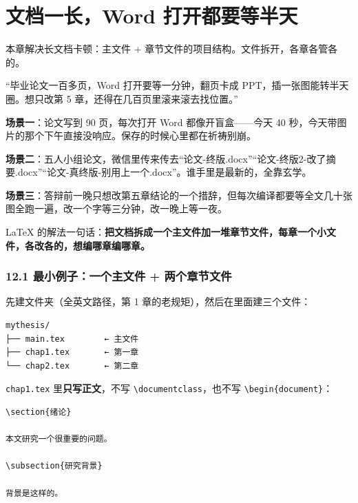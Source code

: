 \chapter{文档一长，Word 打开都要等半天}

\begin{notebox}
本章解决长文档卡顿：主文件 + 章节文件的项目结构。文件拆开，各章各管各的。
\end{notebox}


“毕业论文一百多页，Word 打开要等一分钟，翻页卡成 PPT，插一张图能转半天圈。想只改第 5 章，还得在几百页里滚来滚去找位置。”


\textbf{场景一}：论文写到 90 页，每次打开 Word 都像开盲盒——今天 40 秒，今天带图片的那个下午直接没响应。保存的时候心里都在祈祷别崩。

\textbf{场景二}：五人小组论文，微信里传来传去“论文-终版.docx”“论文-终版2-改了摘要.docx”“论文-真终版-别用上一个.docx”。谁手里是最新的，全靠玄学。

\textbf{场景三}：答辩前一晚只想改第五章结论的一个措辞，但每次编译都要等全文几十张图全跑一遍，改一个字等三分钟，改一晚上等一夜。

LaTeX 的解法一句话：\textbf{把文档拆成一个主文件加一堆章节文件，每章一个小文件，各改各的，想编哪章编哪章。}


\subsection*{12.1 最小例子：一个主文件 + 两个章节文件}

先建文件夹（全英文路径，第 1 章的老规矩），然后在里面建三个文件：

\begin{lstlisting}
mythesis/
├── main.tex        ← 主文件
├── chap1.tex       ← 第一章
└── chap2.tex       ← 第二章
\end{lstlisting}

\texttt{chap1.tex} 里\textbf{只写正文}，不写 \texttt{\textbackslash{}documentclass}，也不写 \texttt{\textbackslash{}begin\{document\}}：

\begin{lstlisting}
\section{绪论}

本文研究一个很重要的问题。

\subsection{研究背景}

背景是这样的。
\end{lstlisting}

